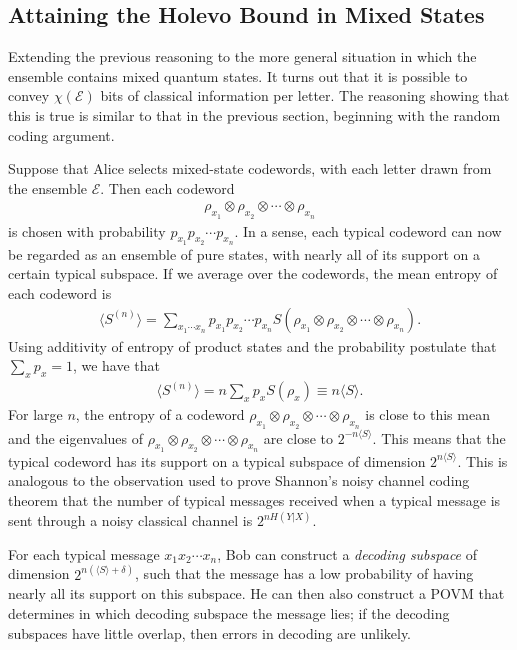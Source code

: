 \documentclass[a4paper, 12pt]{article}
\numberwithin{equation}{section}
\numberwithin{figure}{section}
\theoremstyle{definition}
\begin{document}
    \subsection{Attaining the Holevo Bound in Mixed States}
    Extending the previous reasoning to the more general situation in which the ensemble contains mixed quantum states. It turns out that it is possible to convey $\chi(\mathcal{E})$ bits of classical information per letter. The reasoning showing that this is true is similar to that in the previous section, beginning with the random coding argument. \par
    Suppose that Alice selects mixed-state codewords, with each letter drawn from the ensemble $\mathcal{E}$. Then each codeword
    \begin{align}
        \rho_{x_1} \otimes \rho_{x_2} \otimes \cdots \otimes \rho_{x_n}
    \end{align}
    is chosen with probability $p_{x_1} p_{x_2} \cdots p_{x_n}$. In a sense, each typical codeword can now be regarded as an ensemble of pure states, with nearly all of its support on a certain typical subspace. If we average over the codewords, the mean entropy of each codeword is
    \begin{align}
        \langle S^{(n)} \rangle = \sum_{x_1 \cdots x_n} p_{x_1} p_{x_2} \cdots p_{x_n} S(\rho_{x_1} \otimes \rho_{x_2} \otimes \cdots \otimes \rho_{x_n}).
    \end{align}
    Using additivity of entropy of product states and the probability postulate that $\sum_x p_x = 1$, we have that
    \begin{align}
        \langle S^{(n)} \rangle = n \sum_x p_x S(\rho_x) \equiv n \langle S \rangle.
    \end{align}
    For large $n$, the entropy of a codeword $\rho_{x_1} \otimes \rho_{x_2} \otimes \cdots \otimes \rho_{x_n}$ is close to this mean and the eigenvalues of $\rho_{x_1} \otimes \rho_{x_2} \otimes \cdots \otimes \rho_{x_n}$ are close to $2^{-n \langle S \rangle}$. This means that the typical codeword has its support on a typical subspace of dimension $2^{n \langle S \rangle}$. This is analogous to the observation used to prove Shannon's noisy channel coding theorem that the number of typical messages received when a typical message is sent through a noisy classical channel is $2^{nH(Y | X)}$. \par
    For each typical message $x_1 x_2 \cdots x_n$, Bob can construct a \textit{decoding subspace} of dimension $2^{n(\langle S \rangle + \delta)}$, such that the message has a low probability of having nearly all its support on this subspace. He can then also construct a POVM that determines in which decoding subspace the message lies; if the decoding subspaces have little overlap, then errors in decoding are unlikely. \par
\end{document}
